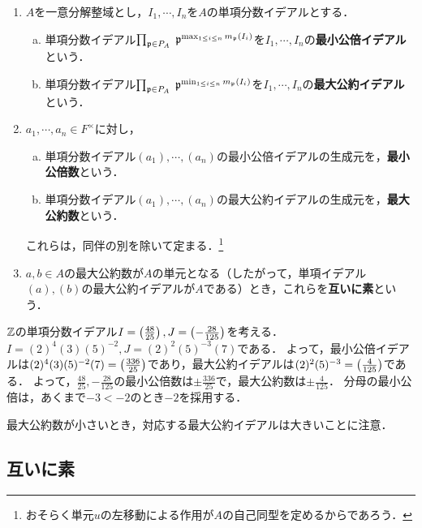 \documentclass[uplatex,dvipdfmx]{jsreport}
\begin{document}
\begin{definition}\mbox{}\label{def-gcd-lcm-in-UFD}
    \begin{enumerate}
        \item $A$を一意分解整域とし，$I_1,\cdots,I_n$を$A$の単項分数イデアルとする．
        \begin{enumerate}[(a)]
            \item 単項分数イデアル$\prod_{\mathfrak{p}\in P_A}\;\mathfrak{p}^{\max_{1\le i\le n}m_{\mathfrak{p}}(I_i)}$を$I_1,\cdots,I_n$の\textbf{最小公倍イデアル}という．
            \item 単項分数イデアル$\prod_{\mathfrak{p}\in P_A}\;\mathfrak{p}^{\min_{1\le i\le n}m_{\mathfrak{p}}(I_i)}$を$I_1,\cdots,I_n$の\textbf{最大公約イデアル}という．
        \end{enumerate}
        \item $a_1,\cdots,a_n\in F^\times$に対し，
        \begin{enumerate}[(a)]
            \item 単項分数イデアル$(a_1),\cdots,(a_n)$の最小公倍イデアルの生成元を，\textbf{最小公倍数}という．
            \item 単項分数イデアル$(a_1),\cdots,(a_n)$の最大公約イデアルの生成元を，\textbf{最大公約数}という．
        \end{enumerate}
        これらは，同伴の別を除いて定まる．\footnote{おそらく単元$u$の左移動による作用が$A$の自己同型を定めるからであろう．}
        \item $a,b\in A$の最大公約数が$A$の単元となる（したがって，単項イデアル$(a),(b)$の最大公約イデアルが$A$である）とき，これらを\textbf{互いに素}という．
    \end{enumerate}
\end{definition}
\begin{example}[整数環での例]
    $\mathbb{Z}$の単項分数イデアル$I=\left(\frac{48}{25}\right),J=\left(-\frac{28}{125}\right)$を考える．$I=(2)^4(3)(5)^{-2},J=(2)^{2}(5)^{-3}(7)$である．
    よって，最小公倍イデアルは$(2)^4(3)(5)^{-2}(7)=\left(\frac{336}{25}\right)$であり，最大公約イデアルは$(2)^2(5)^{-3}=\left(\frac{4}{125}\right)$である．
    よって，$\frac{48}{25},-\frac{28}{125}$の最小公倍数は$\pm\frac{336}{25}$で，最大公約数は$\pm\frac{4}{125}$．
    分母の最小公倍は，あくまで$-3<-2$のとき$-2$を採用する．
\end{example}
\begin{remarks}
    最大公約数が小さいとき，対応する最大公約イデアルは大きいことに注意．
\end{remarks}

\subsection{互いに素}
\end{document}
